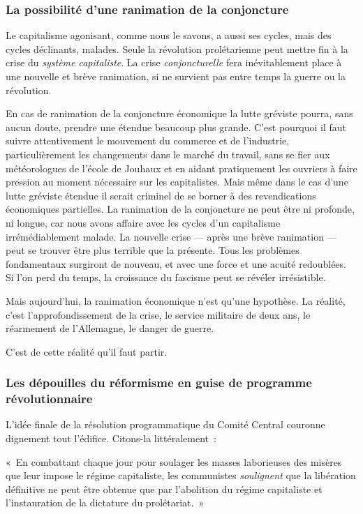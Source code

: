 \documentclass[french,twoside]{book} %
\newenvironment{quoteblock}%
  {\begin{quoting}}
  {\end{quoting}}
\newenvironment{quotebar}{%
    \def\FrameCommand{{\color{rubric!10!}\vrule width 0.5em} \hspace{0.9em}}%
    \def\OuterFrameSep{\itemsep} %
    \MakeFramed {\advance\hsize-\width \FrameRestore}
  }%
  {%
    \endMakeFramed
  }
\renewenvironment{quoteblock}%
  {%
    \savenotes
    \setstretch{0.9}
    \normalfont
    \begin{quotebar}
  }
  {%
    \end{quotebar}
    \spewnotes
  }
\begin{document}
 \subsubsection[{La possibilité d’une ranimation de la conjoncture}]{La possibilité d’une ranimation de la conjoncture}
\noindent Le capitalisme agonisant, comme nous le savons, a aussi ses cycles, mais des cycles déclinants, malades. Seule la révolution prolétarienne peut mettre fin à la crise du \emph{système capitaliste}. La crise \emph{conjoncturelle} fera inévitablement place à une nouvelle et brève ranimation, si ne survient pas entre temps la guerre ou la révolution.\par
En cas de ranimation de la conjoncture économique la lutte gréviste pourra, sans aucun doute, prendre une étendue beaucoup plus grande. C’est pourquoi il faut suivre attentivement le mouvement du commerce et de l’industrie, particulièrement les changements dans le marché du travail, sans se fier aux météorologues de l’école de Jouhaux et en aidant pratiquement les ouvriers à faire pression au moment nécessaire sur les capitalistes. Mais même dans le cas d’une lutte gréviste étendue il serait criminel de se borner à des revendications économiques partielles. La ranimation de la conjoncture ne peut être ni profonde, ni longue, car nous avons affaire avec les cycles d’un capitalisme irrémédiablement malade. La nouvelle crise — après une brève ranimation — peut se trouver être plus terrible que la présente. Tous les problèmes fondamentaux surgiront de nouveau, et avec une force et une acuité redoublées. Si l’on perd du temps, la croissance du fascisme peut se révéler irrésistible.\par
Mais aujourd’hui, la ranimation économique n’est qu’une hypothèse. La réalité, c’est l’approfondissement de la crise, le service militaire de deux ans, le réarmement de l’Allemagne, le danger de guerre.\par
C’est de cette réalité qu’il faut partir.
\subsubsection[{Les dépouilles du réformisme en guise de programme révolutionnaire}]{Les dépouilles du réformisme en guise de programme révolutionnaire}
\noindent L’idée finale de la résolution programmatique du Comité  Central couronne dignement tout l’édifice. Citons-la littéralement :\par

\begin{quoteblock}
 \noindent « En combattant chaque jour pour soulager les masses laborieuses des misères que leur impose le régime capitaliste, les communistes \emph{soulignent} que la libération définitive ne peut être obtenue que par l’abolition du régime capitaliste et l’instauration de la dictature du prolétariat. »
 \end{quoteblock}
\end{document}
